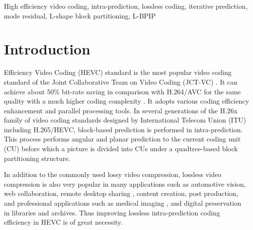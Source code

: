 \documentclass[journal]{IEEEtran}
\begin{document}
\begin{IEEEkeywords}
High efficiency video coding, intra-prediction, lossless coding, iterative prediction, mode residual, L-shape block partitioning, L-BPIP
\end{IEEEkeywords}






%
\IEEEpeerreviewmaketitle



\section{Introduction}
% 
% 
% 
% 
 Efficiency Video Coding (HEVC) standard is the most popular video coding standard of the Joint Collaborative Team on Video Coding (JCT-VC) \cite{01}. It can achieve about 50\% bit-rate saving in comparison with H.264/AVC \cite{02} for the same quality with a much higher coding complexity \cite{03}. It adopts various coding efficiency enhancement and parallel processing tools. In several generations of the H.26x family of video coding standards designed by International Telecom Union (ITU) including H.265/HEVC, block-based prediction is performed in intra-prediction.  This process performs angular and planar prediction to the current coding unit (CU) before which a picture is divided into CUs under a quadtree-based block partitioning structure.

In addition to the commonly used lossy video compression, lossless video compression is also very popular in many applications such as automotive vision, web collaboration, remote desktop sharing \cite{04}, content creation, post production, and professional applications such as medical imaging \cite{05}, and digital preservation in libraries and archives. Thus improving lossless intra-prediction coding efficiency in HEVC is of great necessity.
\end{document}
